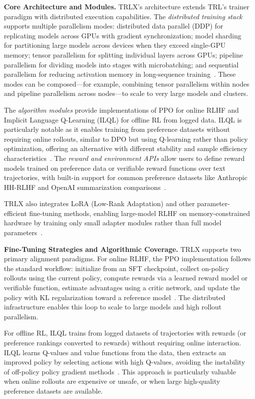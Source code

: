 \documentclass[conference]{IEEEtran}
\begin{document}
\textbf{Core Architecture and Modules.} TRLX's architecture extends TRL's trainer paradigm with distributed execution capabilities. The \textit{distributed training stack} supports multiple parallelism modes: distributed data parallel (DDP) for replicating models across GPUs with gradient synchronization; model sharding for partitioning large models across devices when they exceed single-GPU memory; tensor parallelism for splitting individual layers across GPUs; pipeline parallelism for dividing models into stages with microbatching; and sequential parallelism for reducing activation memory in long-sequence training~\cite{trlx-paper}. These modes can be composed—for example, combining tensor parallelism within nodes and pipeline parallelism across nodes—to scale to very large models and clusters.

The \textit{algorithm modules} provide implementations of PPO for online RLHF and Implicit Language Q-Learning (ILQL) for offline RL from logged data. ILQL is particularly notable as it enables training from preference datasets without requiring online rollouts, similar to DPO but using Q-learning rather than policy optimization, offering an alternative with different stability and sample efficiency characteristics~\cite{trlx-paper, ilql-paper}. The \textit{reward and environment APIs} allow users to define reward models trained on preference data or verifiable reward functions over text trajectories, with built-in support for common preference datasets like Anthropic HH-RLHF and OpenAI summarization comparisons~\cite{trlx-blog}.

TRLX also integrates LoRA (Low-Rank Adaptation) and other parameter-efficient fine-tuning methods, enabling large-model RLHF on memory-constrained hardware by training only small adapter modules rather than full model parameters~\cite{trlx-paper}.

\textbf{Fine-Tuning Strategies and Algorithmic Coverage.} TRLX supports two primary alignment paradigms. For online RLHF, the PPO implementation follows the standard workflow: initialize from an SFT checkpoint, collect on-policy rollouts using the current policy, compute rewards via a learned reward model or verifiable function, estimate advantages using a critic network, and update the policy with KL regularization toward a reference model~\cite{trlx-paper}. The distributed infrastructure enables this loop to scale to large models and high rollout parallelism.

For offline RL, ILQL trains from logged datasets of trajectories with rewards (or preference rankings converted to rewards) without requiring online interaction. ILQL learns Q-values and value functions from the data, then extracts an improved policy by selecting actions with high Q-values, avoiding the instability of off-policy policy gradient methods~\cite{ilql-paper}. This approach is particularly valuable when online rollouts are expensive or unsafe, or when large high-quality preference datasets are available.
\end{document}
